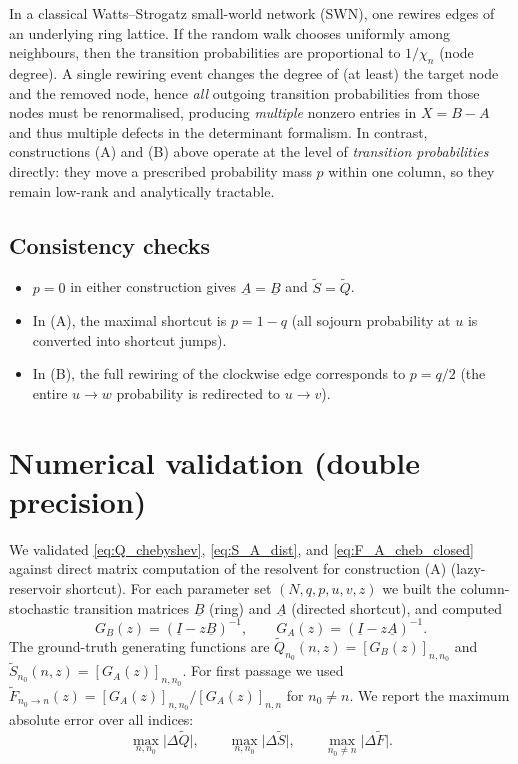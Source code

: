 \documentclass[11pt]{article}
\begin{document}
In a classical Watts--Strogatz small-world network (SWN), one rewires edges of an underlying ring lattice.
If the random walk chooses uniformly among neighbours, then the transition probabilities are proportional to $1/\chi_n$ (node degree).
A single rewiring event changes the degree of (at least) the target node and the removed node, hence \emph{all} outgoing transition probabilities
from those nodes must be renormalised, producing \emph{multiple} nonzero entries in $X=B-A$ and thus multiple defects in the determinant formalism.
In contrast, constructions (A) and (B) above operate at the level of \emph{transition probabilities} directly:
they move a prescribed probability mass $p$ within one column, so they remain low-rank and analytically tractable.

\subsection{Consistency checks}

\begin{itemize}
\item $p=0$ in either construction gives $\underline{A}=\underline{B}$ and $\tilde S=\tilde Q$.
\item In (A), the maximal shortcut is $p=1-q$ (all sojourn probability at $u$ is converted into shortcut jumps).
\item In (B), the full rewiring of the clockwise edge corresponds to $p=q/2$ (the entire $u\to w$ probability is redirected to $u\to v$).
\end{itemize}

\section*{Numerical validation (double precision)}

We validated \eqref{eq:Q_chebyshev}, \eqref{eq:S_A_dist}, and \eqref{eq:F_A_cheb_closed} against direct matrix computation of the resolvent
for construction (A) (lazy-reservoir shortcut).
For each parameter set $(N,q,p,u,v,z)$ we built the column-stochastic transition matrices $\underline{B}$ (ring) and $\underline{A}$ (directed shortcut),
and computed
\[
G_B(z)=(\underline{I}-z\underline{B})^{-1},\qquad
G_A(z)=(\underline{I}-z\underline{A})^{-1}.
\]
The ground-truth generating functions are $\tilde Q_{n_0}(n,z)=[G_B(z)]_{n,n_0}$ and $\tilde S_{n_0}(n,z)=[G_A(z)]_{n,n_0}$.
For first passage we used $\tilde F_{n_0\to n}(z)=[G_A(z)]_{n,n_0}/[G_A(z)]_{n,n}$ for $n_0\neq n$.
We report the maximum absolute error over all indices:
\[
\max_{n,n_0}\bigl|\Delta\tilde Q\bigr|,\qquad
\max_{n,n_0}\bigl|\Delta\tilde S\bigr|,\qquad
\max_{n_0\neq n}\bigl|\Delta\tilde F\bigr|.
\]
\end{document}
